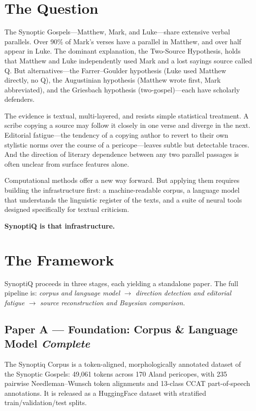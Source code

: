 \documentclass[11pt,letterpaper]{article}
\begin{document}
\section{The Question}

The Synoptic Gospels---Matthew, Mark, and Luke---share extensive verbal
parallels.  Over 90\% of Mark's verses have a parallel in Matthew, and
over half appear in Luke.  The dominant explanation, the Two-Source
Hypothesis, holds that Matthew and Luke independently used Mark and a
lost sayings source called Q.  But alternatives---the Farrer--Goulder
hypothesis (Luke used Matthew directly, no Q), the Augustinian hypothesis
(Matthew wrote first, Mark abbreviated), and the Griesbach hypothesis
(two-gospel)---each have scholarly defenders.

The evidence is textual, multi-layered, and resists simple statistical
treatment.  A scribe copying a source may follow it closely in one verse
and diverge in the next.  Editorial fatigue---the tendency of a copying
author to revert to their own stylistic norms over the course of a
pericope---leaves subtle but detectable traces.  And the direction of
literary dependence between any two parallel passages is often unclear
from surface features alone.

Computational methods offer a new way forward.  But applying them
requires building the infrastructure first: a machine-readable corpus,
a language model that understands the linguistic register of the texts,
and a suite of neural tools designed specifically for textual criticism.

\textbf{SynoptiQ is that infrastructure.}

\section{The Framework}

SynoptiQ proceeds in three stages, each yielding a standalone paper.
The full pipeline is: \textit{corpus and language model $\rightarrow$
direction detection and editorial fatigue $\rightarrow$ source
reconstruction and Bayesian comparison.}

\subsection{Paper A --- Foundation: Corpus \& Language Model \hfill \textit{Complete}}

The Synoptiq Corpus is a token-aligned, morphologically annotated dataset
of the Synoptic Gospels: 49,061 tokens across 170 Aland pericopes, with
235 pairwise Needleman--Wunsch token alignments and 13-class CCAT
part-of-speech annotations.  It is released as a HuggingFace dataset with
stratified train/validation/test splits.
\end{document}
